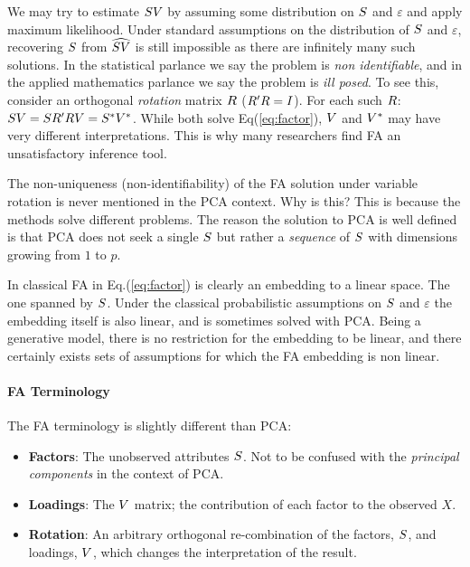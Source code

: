 \documentclass[12pt,a4paper]{article}
\begin{document}
We may try to estimate $S V $ by assuming some distribution on $S$ and $\varepsilon$ and apply maximum likelihood.
Under standard assumptions on the distribution of $S$ and $\varepsilon$, recovering  $S$ from $\widehat{S V }$ is still impossible as there are infinitely many such solutions.
In the statistical parlance we say the problem is \emph{non identifiable}, and in the applied mathematics parlance we say the problem is \emph{ill posed}.
To see this, consider an orthogonal \emph{rotation} matrix $R$ ($R' R=I$). For each such $R$: $ S V = S R' R V = S^* V^* $.
While both solve Eq(\ref{eq:factor}), $V$ and $V^*$ may have very different interpretations. 
This is why many researchers find FA an unsatisfactory inference tool.


\begin{remark}
	The non-uniqueness (non-identifiability) of the FA solution under variable rotation is never mentioned in the PCA context. Why is this?
	This is because the methods solve different problems. 
	The reason the solution to PCA is well defined is that PCA does not seek a single $S$ but rather a \emph{sequence} of $S$ with dimensions growing from $1$ to $p$. 
\end{remark}


\begin{remark}
	In classical FA in Eq.(\ref{eq:factor}) is clearly an embedding to a linear space. 
	The one spanned by $S$. 
	Under the classical probabilistic assumptions on $S$ and $\varepsilon$ the embedding itself is also linear, and is sometimes solved with PCA. 
	Being a generative model, there is no restriction for the embedding to be linear, and there certainly exists sets of assumptions for which the FA embedding is non linear. 
\end{remark}

\paragraph{FA Terminology}
The FA terminology is slightly different than PCA:
\begin{itemize}
	\item \textbf{Factors}: The unobserved attributes $S$. 
	Not to be confused with the \emph{principal components} in the context of PCA.

	\item \textbf{Loadings}: 
	The $V$ matrix; the contribution of each factor to the observed $X$.

	\item \textbf{Rotation}: An arbitrary orthogonal re-combination of the factors, $S$, and loadings, $V$, which changes the interpretation of the result.
\end{itemize}
\end{document}
